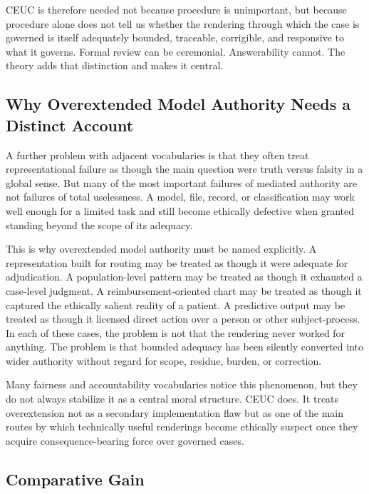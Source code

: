 \documentclass[11pt]{article}
\begin{document}
CEUC is therefore needed not because procedure is unimportant, but because procedure alone does not tell us whether the rendering through which the case is governed is itself adequately bounded, traceable, corrigible, and responsive to what it governs. Formal review can be ceremonial. Answerability cannot. The theory adds that distinction and makes it central.

\subsection{Why Overextended Model Authority Needs a Distinct Account}

A further problem with adjacent vocabularies is that they often treat representational failure as though the main question were truth versus falsity in a global sense. But many of the most important failures of mediated authority are not failures of total uselessness. A model, file, record, or classification may work well enough for a limited task and still become ethically defective when granted standing beyond the scope of its adequacy. \cite{BowkerStar1999SortingThingsOut,LepriEtAl2018FairTransparentAccountableADM,Tabassi2023NISTAIRMF}

This is why overextended model authority must be named explicitly. A representation built for routing may be treated as though it were adequate for adjudication. A population-level pattern may be treated as though it exhausted a case-level judgment. A reimbursement-oriented chart may be treated as though it captured the ethically salient reality of a patient. A predictive output may be treated as though it licensed direct action over a person or other subject-process. In each of these cases, the problem is not that the rendering never worked for anything. The problem is that bounded adequacy has been silently converted into wider authority without regard for scope, residue, burden, or correction.

Many fairness and accountability vocabularies notice this phenomenon, but they do not always stabilize it as a central moral structure. CEUC does. It treats overextension not as a secondary implementation flaw but as one of the main routes by which technically useful renderings become ethically suspect once they acquire consequence-bearing force over governed cases.

\subsection{Comparative Gain}
\end{document}
